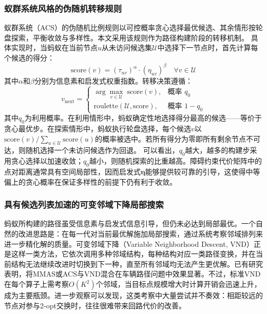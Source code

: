 \documentclass[lettersize,journal]{IEEEtran}
\begin{document}
\subsubsection{蚁群系统风格的伪随机转移规则}
蚁群系统（ACS）的伪随机比例规则\textcolor{blue}{\cite{ref22}}以可控概率贪心选择最优候选、其余情形按轮盘探索，平衡收敛与多样性。本文采用该规则作为路径构建阶段的转移机制。
具体实现时，当蚂蚁在当前节点$u$从未访问候选集$\mathcal{U}$中选择下一节点时，首先计算每个候选的得分：
\begin{equation}
\mathrm{score}(v) = (\tau_{uv})^{\alpha} \cdot (\eta_{uv})^{\beta} \quad \forall v \in \mathcal{U}
\label{eq:score}
\end{equation}
其中$\alpha$和$\beta$分别为信息素和启发式权重指数。转移决策遵循：
\begin{equation}
v_{\mathrm{next}} =
\begin{cases}
\arg\max_{v \in \mathcal{U}} \; \mathrm{score}(v), & \text{概率 } q_0 \\
\mathrm{roulette}(\mathcal{U}, \mathrm{score}), & \text{概率 } 1 - q_0
\end{cases}
\label{eq:trans}
\end{equation}
其中$q_0$为利用概率。在利用情形中，蚂蚁确定性地选择得分最高的候选——等价于贪心最优步。在探索情形中，蚂蚁执行轮盘选择，每个候选$v$以$\mathrm{score}(v) / \sum_{u \in \mathcal{U}} \mathrm{score}(u)$的概率被选中。若所有得分为零即所有剩余节点不可达，则随机选择一个未访问候选作为回退。
可以看出，$q_0$越大，越多的构建步采用贪心选择以加速收敛；$q_0$越小，则随机探索的比重越高。障碍约束代价矩阵中的点对距离通常具有空间局部性，因而启发式$\bm{\eta}$能够提供较可靠的引导，这使得中等偏上的贪心概率在保证多样性的前提下仍有利于收敛。
\subsubsection{具有候选列表加速的可变邻域下降局部搜索}
\label{subsec:vnd}
蚂蚁所构建的路径虽受信息素与启发式信息引导，但仍未必达到局部最优。一个自然的改进思路是：在每一代对当前最优解施加局部搜索，通过系统考察邻域排列来进一步精化解的质量。可变邻域下降（Variable Neighborhood Descent, VND）\textcolor{blue}{\cite{ref24}}正是这样一类方法，它依次调用多种邻域结构，每种结构对应一类路径变换，并在当前结构无法继续改进时切换到下一种，直至所有邻域均无法产生更优解。已有研究表明，将MMAS或ACS与VND混合在车辆路径问题中效果显著\textcolor{blue}{\cite{ref25}}。不过，标准VND在每个算子上需考察$O(K^2)$个邻域，当目标点规模增大时计算开销会迅速上升，成为主要瓶颈。进一步观察可以发现，这类考察中大量尝试并不奏效：相距较远的节点对参与2-opt交换时，往往很难带来回路代价的改善。
\end{document}
